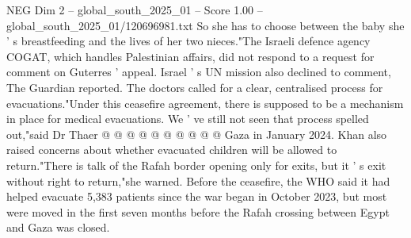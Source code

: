 \begin{textsample}{NEG Dim 2 – global\_south\_2025\_01 – Score 1.00 – global\_south\_2025\_01/120696981.txt}
So she has to choose between the baby she ' s breastfeeding and the lives of her two nieces."The Israeli defence agency COGAT, which handles Palestinian affairs, did not respond to a request for comment on Guterres ' appeal.
Israel ' s UN mission also declined to comment, The Guardian reported.
The doctors called for a clear, centralised process for evacuations."Under this ceasefire agreement, there is supposed to be a mechanism in place for medical evacuations.
We ' ve still not seen that process spelled out,"said Dr Thaer @ @ @ @ @ @ @ @ @ @ Gaza in January 2024.
Khan also raised concerns about whether evacuated children will be allowed to return."There is talk of the Rafah border opening only for exits, but it ' s exit without right to return,"she warned.
Before the ceasefire, the WHO said it had helped evacuate 5,383 patients since the war began in October 2023, but most were moved in the first seven months before the Rafah crossing between Egypt and Gaza was closed.

\end{textsample}
